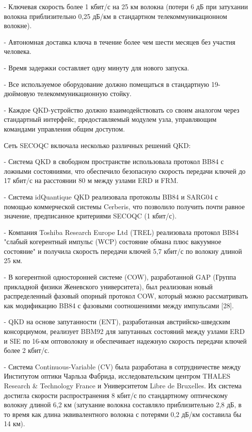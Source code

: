 - Ключевая скорость более 1 кбит/с на 25 км волокна (потери 6 дБ при затухании волокна приблизительно 0,25 дБ/км в стандартном телекоммуникационном волокне).

- Автономная доставка ключа в течение более чем шести месяцев без участия человека.

- Время задержки составляет одну минуту для нового запуска. 

- Все используемое оборудование должно помещаться в стандартную 19-дюймовую телекоммуникационную стойку.

- Каждое QKD-устройство должно взаимодействовать со своим аналогом через стандартный интерфейс, предоставляемый модулем узла, управляющим командами управления общим доступом. 

Сеть SECOQC включала несколько различных решений QKD:

- Система QKD в свободном пространстве использовала протокол BB84 с ложными состояниями, что обеспечило безопасную скорость передачи ключей до 17 кбит/с на расстоянии 80 м между узлами ERD и FRM.

- Система idQuantique QKD реализовала протоколы BB84 и SARG04 с помощью коммерческой системы Cerberis, что позволило получить почти равное значение, предписанное критериями SECOQC (1 кбит/с).

- Компания Toshiba Research Europe Ltd (TREL) реализовала протокол BB84 "слабый когерентный импульс (WCP) состояние обмана плюс вакуумное состояние" и получила скорость передачи ключей 5,7 кбит/с по волокну длиной 25 км.

- В когерентной односторонней системе (COW), разработанной GAP (Группа прикладной физики Женевского университета), был реализован новый распределенный фазовый опорный протокол COW, который можно рассматривать как модификацию BB84 с фазовыми соотношениями между импульсами [28].

- QKD на основе запутанности (ENT), разработанная австрийско-шведским консорциумом, реализует BBM92 для запутанных состояний между узлами ERD и SIE по 16-км оптоволокну и обеспечивает надежную скорость передачи ключей более 2 кбит/с.

- Система Continuous-Variable (CV) была разработана в сотрудничестве между Институтом оптики Чарльза Фабрида, исследовательским центром THALES Research \& Technology France и Университетом Libre de Bruxelles. Их система достигла скорости распространения 8 кбит/с по стандартному оптическому волокну длиной 6,2 км (затухание волокна составляло приблизительно 2,8 дБ, в то время как длина эквивалентного волокна с потерями 0,2 дБ/км составила бы 14 км).


